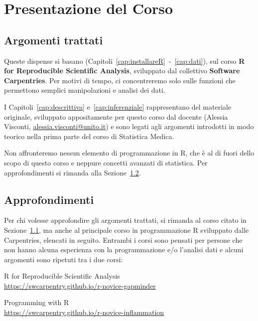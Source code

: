 \chapter{Presentazione del Corso}


\section{Argomenti trattati}
\label{sec:presentazione}

Queste dispense si basano (Capitoli~\ref{cap:installareR}~-~\ref{cap:dati}), sul corso \textbf{R for Reproducible Scientific Analysis}, sviluppato dal collettivo \textbf{Software Carpentries}. Per motivi di tempo, ci concentreremo solo sulle funzioni che permettono semplici manipolazioni e analisi dei dati. 

\noindent I Capitoli~\ref{cap:descrittiva} e~\ref{cap:inferenziale} rappresentano del materiale originale, sviluppato appositamente per questo corso dal docente (Alessia Visconti, \href{mailto:alessia.visconti@unito.it}{alessia.visconti@unito.it}) e sono legati agli argomenti introdotti in modo teorico nella prima parte del corso di Statistica Medica. 

\noindent Non affronteremo nessun elemento di programmazione in R, che \`e al di fuori dello scopo di questo corso e neppure concetti avanzati di statistica. Per approfondimenti si rimanda alla Sezione~\ref{sec:corsi_carpentries}. 


%

\section{Approfondimenti}
\label{sec:corsi_carpentries}

Per chi volesse approfondire gli argomenti trattati, si rimanda al corso citato in Sezione~\ref{sec:presentazione}, ma anche al principale corso in programmazione R sviluppato dalle Carpentries, elencati in seguito. Entrambi i corsi sono pensati per persone che non hanno alcuna esperienza con la programmazione e/o l'analisi dati e alcuni argomenti sono ripetuti tra i due corsi:

\begin{myitemize}
	\item R for Reproducible Scientific Analysis \\ \url{https://swcarpentry.github.io/r-novice-gapminder}
	\item Programming with R \\ \url{https://swcarpentry.github.io/r-novice-inflammation}
\end{myitemize}

